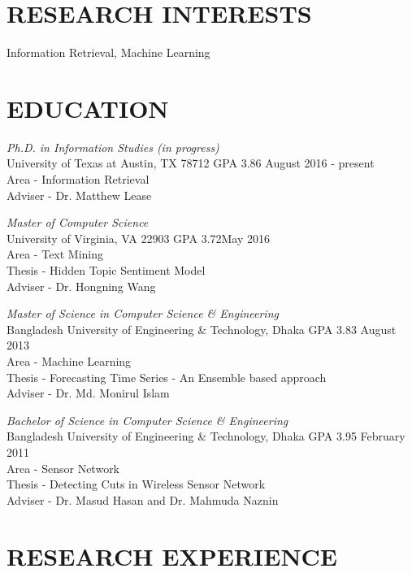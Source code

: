 \documentclass[11pt]{res}
\begin{document}
\begin{resume}
\section{RESEARCH INTERESTS}
Information Retrieval, Machine Learning


\section{EDUCATION}
{\sl Ph.D. in  Information Studies (in progress)}\\
University of Texas at Austin, TX 78712 \hspace{1.45in} GPA 3.86 \hfill  August 2016 - present\\
Area - Information Retrieval\\
Adviser - Dr. Matthew Lease


{\sl Master of Computer Science}\\
University of Virginia, VA 22903 \hspace{2.00in} GPA 3.72\hfill  May 2016\\
Area - Text Mining\\
Thesis - Hidden Topic Sentiment Model\\
Adviser - Dr. Hongning Wang

{\sl Master of Science in Computer Science \& Engineering} \\
Bangladesh University of Engineering \& Technology, Dhaka \hspace{0.2in}  GPA 3.83 \hfill August 2013 \\
Area - Machine Learning\\
Thesis - Forecasting Time Series - An Ensemble based approach\\
Adviser - Dr. Md. Monirul Islam

{\sl Bachelor of Science in Computer Science \& Engineering} \\
Bangladesh University of Engineering \& Technology, Dhaka \hspace{0.2in}  GPA 3.95 \hfill February 2011 \\
Area - Sensor Network\\
Thesis - Detecting Cuts in Wireless Sensor Network \\
Adviser - Dr. Masud Hasan and Dr. Mahmuda Naznin

\vspace{0.05in}
\section{RESEARCH EXPERIENCE}


\end{resume}
\end{document}
